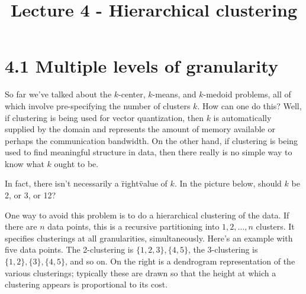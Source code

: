 \documentclass{article}
\title{Lecture 4 - Hierarchical clustering}
\author{}
\date{}
\begin{document}
\maketitle

\section*{4.1 Multiple levels of granularity}

So far we've talked about the $k$-center, $k$-means, and $k$-medoid problems, all of which involve pre-specifying the number of clusters $k$. How can one do this? Well, if clustering is being used for vector quantization, then $k$ is automatically supplied by the domain and represents the amount of memory available or perhaps the communication bandwidth. On the other hand, if clustering is being used to find meaningful structure in data, then there really is no simple way to know what $k$ ought to be.

In fact, there isn't necessarily a \"right\" value of $k$. In the picture below, should $k$ be 2, or 3, or 12?

One way to avoid this problem is to do a hierarchical clustering of the data. If there are $n$ data points, this is a recursive partitioning into $1, 2, \ldots, n$ clusters. It specifies clusterings at all granularities, simultaneously. Here's an example with five data points. The 2-clustering is $\{1, 2, 3\}, \{4, 5\}$, the 3-clustering is $\{1, 2\}, \{3\}, \{4, 5\}$, and so on. On the right is a dendrogram representation of the various clusterings; typically these are drawn so that the height at which a clustering appears is proportional to its cost.

\end{document}
